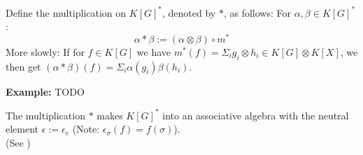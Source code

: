 \begin{definition}
  Define the multiplication on $ K \left\lbrack G \right\rbrack^\ast $, denoted by $\ast$, as follows:  For $\alpha, \beta \in K \left\lbrack G \right\rbrack^\ast$:  
  \begin{equation}
    \alpha \ast \beta := \left( \alpha \otimes \beta \right) \circ m^\ast
  \end{equation}
  More slowly: If for $f \in K \left\lbrack G \right\rbrack$ we have $m^\ast \left( f \right) = \Sigma_i g_i \otimes h_i \in K[G] \otimes K[X]$, we then get $\left( \alpha \ast \beta \right) \left( f \right) = \Sigma_i \alpha \left( g_i \right) \beta \left( h_i \right)$.
\end{definition}
%
%

\textbf{Example:} TODO

\begin{proposition}
  The multiplication $\ast$ makes $K \left\lbrack G \right\rbrack^\ast$ into an associative algebra with the neutral element $ \epsilon := \epsilon_e$ (Note: $\epsilon_\sigma \left( f \right) = f \left( \sigma \right)$).\\
  (See \cite[A2.2]{DK15})
\end{proposition}

